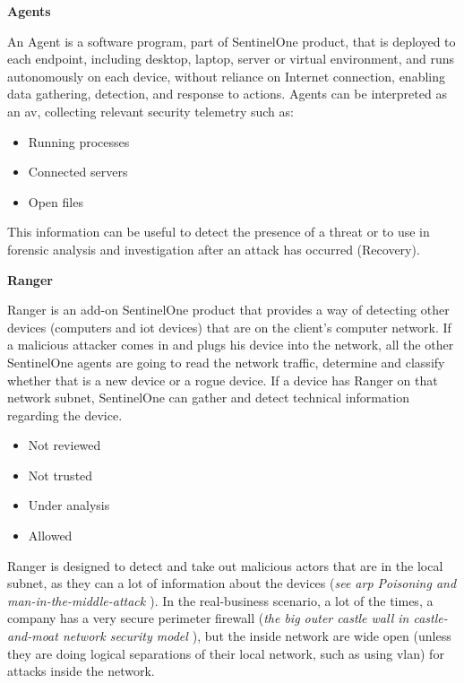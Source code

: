 \textbf{Agents}

An Agent is a software program, part of SentinelOne product, that is deployed to each endpoint, including desktop, laptop,
server or virtual environment, and runs autonomously on each device, without reliance on Internet connection, enabling data
gathering, detection, and response to actions. Agents can be interpreted as an \acrshort{av}, collecting relevant security
telemetry such as:
\begin{itemize}
      \item Running processes
      \item Connected servers
      \item Open files
\end{itemize}
This information can be useful to detect the presence of a threat or to use in forensic analysis and investigation after
an attack has occurred (Recovery).

\textbf{Ranger}

Ranger is an add-on SentinelOne product that provides a way of detecting other devices (computers and
\acrshort{iot} devices) that are on the client's computer network. If a malicious attacker comes in and plugs his device
into the network, all the other SentinelOne agents are going to read the network traffic, determine and classify whether
that is a new device or a rogue device. If a device has Ranger on that network subnet, SentinelOne can gather and
detect technical information regarding the device.

\begin{itemize}
      \item Not reviewed
      \item Not trusted
      \item Under analysis
      \item Allowed
\end{itemize}

Ranger is designed to detect and take out malicious actors that are in the local subnet, as they can a lot of information about the
devices (\textit{see \acrshort{arp} Poisoning \cite{arpSpoofing} and man-in-the-middle-attack \cite{man-in-the-middleAttack}}).
In the real-business scenario, a lot of the times, a company has a very secure perimeter firewall
(\textit{the big outer castle wall in castle-and-moat network security model \cite{castleMoatWallNetwork}}), but the inside network
are wide open (unless they are doing logical separations of their local network, such as using \acrshort{vlan}) for attacks inside
the network.

